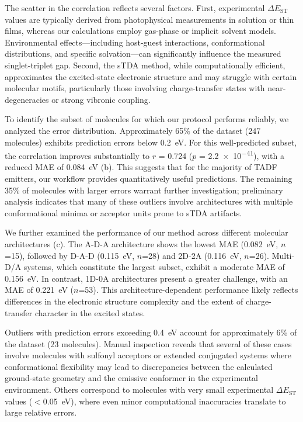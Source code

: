 \documentclass[journal=jcisd8,manuscript=article,keywords=true]{achemso}
\begin{document}
The scatter in the correlation reflects several factors. First, experimental $\Delta E_{\mathrm{ST}}$ values are typically derived from photophysical measurements in solution or thin films, whereas our calculations employ gas-phase or implicit solvent models. Environmental effects---including host-guest interactions, conformational distributions, and specific solvation---can significantly influence the measured singlet-triplet gap. Second, the sTDA method, while computationally efficient, approximates the excited-state electronic structure and may struggle with certain molecular motifs, particularly those involving charge-transfer states with near-degeneracies or strong vibronic coupling.

To identify the subset of molecules for which our protocol performs reliably, we analyzed the error distribution. Approximately 65\% of the dataset (\num{247} molecules) exhibits prediction errors below \qty{0.2}{\electronvolt}. For this well-predicted subset, the correlation improves substantially to $r$ = \num{0.724} ($p$ = \num{2.2e-41}), with a reduced MAE of \qty{0.084}{\electronvolt} (b). This suggests that for the majority of TADF emitters, our workflow provides quantitatively useful predictions. The remaining 35\% of molecules with larger errors warrant further investigation; preliminary analysis indicates that many of these outliers involve architectures with multiple conformational minima or acceptor units prone to sTDA artifacts.

We further examined the performance of our method across different molecular architectures (c). The A-D-A architecture shows the lowest MAE (\qty{0.082}{\electronvolt}, $n$=15), followed by D-A-D (\qty{0.115}{\electronvolt}, $n$=28) and 2D-2A (\qty{0.116}{\electronvolt}, $n$=26). Multi-D/A systems, which constitute the largest subset, exhibit a moderate MAE of \qty{0.156}{\electronvolt}. In contrast, 1D-0A architectures present a greater challenge, with an MAE of \qty{0.221}{\electronvolt} ($n$=53). This architecture-dependent performance likely reflects differences in the electronic structure complexity and the extent of charge-transfer character in the excited states.

Outliers with prediction errors exceeding \qty{0.4}{\electronvolt} account for approximately 6\% of the dataset (\num{23} molecules). Manual inspection reveals that several of these cases involve molecules with sulfonyl acceptors or extended conjugated systems where conformational flexibility may lead to discrepancies between the calculated ground-state geometry and the emissive conformer in the experimental environment. Others correspond to molecules with very small experimental $\Delta E_{\mathrm{ST}}$ values ($<$\qty{0.05}{\electronvolt}), where even minor computational inaccuracies translate to large relative errors.
\end{document}
